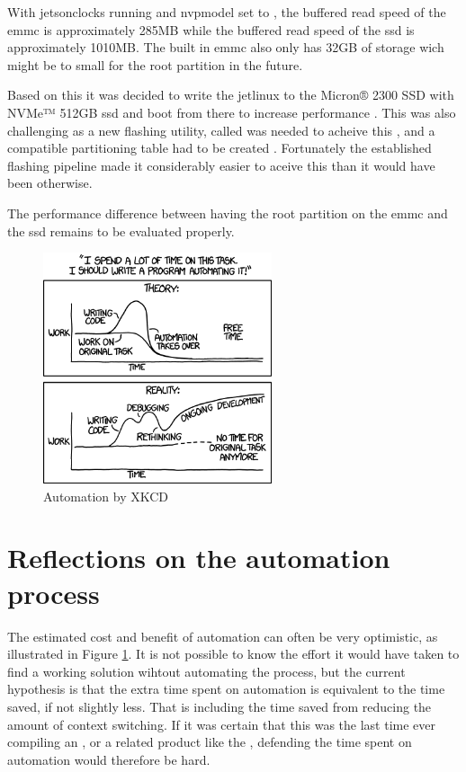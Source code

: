With \gls{jetsonclocks} running and \gls{nvpmodel} set to , the buffered read speed of the \gls{emmc} is approximately 285MB while the buffered read speed of the \gls{ssd} is approximately 1010MB.
The built in \gls{emmc} also only has 32GB of storage \cite{nvidiaNVIDIAJetsonAGX2019} wich might be to small for the root partition in the future.

Based on this it was decided to write the \gls{jetlinux} to the Micron® 2300 SSD with NVMe™ 512GB \gls{ssd} and boot from there to increase performance \cite{microntechnologyMicron2300SSD2020}.
This was also challenging as a new flashing utility, called  was needed to acheive this \cite{rigerunNVIDIAJetpackFlashing2021}, and a compatible partitioning table had to be created \cite{nvidiaPartitionConfigurationJetson2022}.
Fortunately the established flashing pipeline made it considerably easier to aceive this than it would have been otherwise.

The performance difference between having the root partition on the \gls{emmc} and the \gls{ssd} remains to be evaluated properly.

\begin{figure}[H]
    \centering
    \includegraphics[width=0.6\textwidth]{figures/xkcd_automation.png}
    \caption{Automation by XKCD \cite{xkcdAutomation2014}}
    \label{fig:xkcd_automation}
\end{figure}

\section{Reflections on the automation process}
The estimated cost and benefit of automation can often be very optimistic, as illustrated in Figure \ref{fig:xkcd_automation}.
It is not possible to know the effort it would have taken to find a working solution wihtout automating the process, but the current hypothesis is that the extra time spent on automation is equivalent to the time saved, if not slightly less.
That is including the time saved from reducing the amount of context switching.
If it was certain that this was the last time ever compiling an \jx, or a related \jetson product like the \jo, defending the time spent on automation would therefore be hard.

